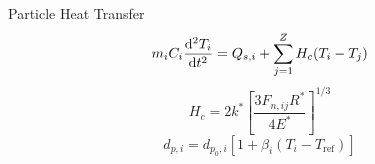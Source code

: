 


\begin{frame}{Particle Heat Transfer}
\begin{equation}\label{eq:thermoFirstLaw}
	m_iC_i\frac{\mathrm{d}^2{T_i}}{\mathrm{d}t^2} = Q_{s,i} + \sum_{j=1}^Z H_c(T_i - T_j)
\end{equation}
\begin{equation}\label{eq:dem-conductance}
	H_c= 2k^*\left[\frac{3F_{n,ij}R^*}{4E^*}\right]^{1/3}
\end{equation}
\begin{equation}
	d_{p,i} = d_{p_0,i}\left[1+\beta_i\left(T_i - T_\text{ref}\right)\right]
\end{equation}
\end{frame}

